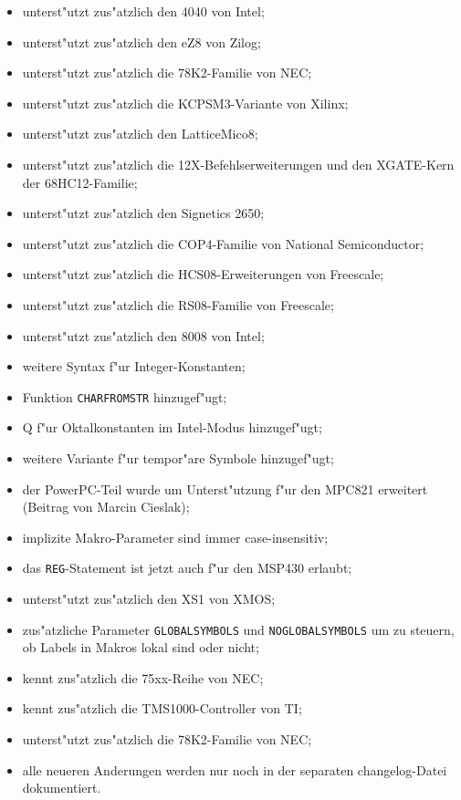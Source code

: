 \documentclass[12pt,a4paper,twoside]{report}
\newcommand{\tty}[1]{{\tt #1}}
\begin{document}
\begin{itemize}
{\begin{itemize}
      \item{unterst"utzt zus"atzlich den 4040 von Intel;}
      \item{unterst"utzt zus"atzlich den eZ8 von Zilog;}
      \item{unterst"utzt zus"atzlich die 78K2-Familie von NEC;}
      \item{unterst"utzt zus"atzlich die KCPSM3-Variante von Xilinx;}
      \item{unterst"utzt zus"atzlich den LatticeMico8;}
      \item{unterst"utzt zus"atzlich die 12X-Befehlserweiterungen
            und den XGATE-Kern der 68HC12-Familie;}
      \item{unterst"utzt zus"atzlich den Signetics 2650;}
      \item{unterst"utzt zus"atzlich die COP4-Familie von National
            Semiconductor;}
      \item{unterst"utzt zus"atzlich die HCS08-Erweiterungen von Freescale;}
      \item{unterst"utzt zus"atzlich die RS08-Familie von Freescale;}
      \item{unterst"utzt zus"atzlich den 8008 von Intel;}
      \item{weitere Syntax f"ur Integer-Konstanten;}
      \item{Funktion \tty{CHARFROMSTR} hinzugef"ugt;}
      \item{Q f"ur Oktalkonstanten im Intel-Modus hinzugef"ugt;}
      \item{weitere Variante f"ur tempor"are Symbole hinzugef"ugt;}
      \item{der PowerPC-Teil wurde um Unterst"utzung f"ur den MPC821 erweitert
            (Beitrag von Marcin Cieslak);}
      \item{implizite Makro-Parameter sind immer case-insensitiv;}
      \item{das \tty{REG}-Statement ist jetzt auch f"ur den MSP430
            erlaubt;}
      \item{unterst"utzt zus"atzlich den XS1 von XMOS;}
      \item{zus"atzliche Parameter \tty{GLOBALSYMBOLS} und
            \tty{NOGLOBALSYMBOLS} um zu steuern, ob Labels
            in Makros lokal sind oder nicht;}
      \item{kennt zus"atzlich die 75xx-Reihe von NEC;}
      \item{kennt zus"atzlich die TMS1000-Controller von TI;}
      \item{unterst"utzt zus"atzlich die 78K2-Familie von NEC;}
      \item{alle neueren Anderungen werden nur noch in der
            separaten changelog-Datei dokumentiert.}
      \end{itemize}}
\end{itemize}
\end{document}
